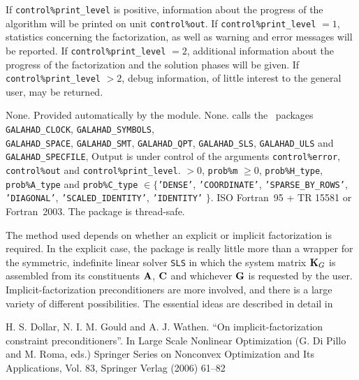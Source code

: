 \documentclass{galahad}
\newcommand{\packagename}{SBLS}
\begin{document}

\galinfo
If {\tt control\%print\_level} is positive, information about the progress
of the algorithm will be printed on unit {\tt control\-\%out}.
If {\tt control\%print\_level} $= 1$, statistics concerning the factorization,
as well as warning and error messages will be reported.
If {\tt control\%print\_level} $= 2$, additional information about the
progress of the factorization and the solution phases will be given.
If {\tt control\%print\_level} $> 2$, debug information, of little
interest to the general user, may be returned.


\galgeneral

\galcommon None.
\galworkspace Provided automatically by the module.
\galroutines None.
\galmodules {\tt \packagename\_solve} calls the \galahad\ packages
{\tt GALAHAD\_CLOCK},
{\tt GALAHAD\_SY\-M\-BOLS}, \\
{\tt GALAHAD\-\_SPACE},
{\tt GALAHAD\_SMT},
{\tt GALAHAD\_QPT},
{\tt GALAHAD\_SLS},
{\tt GALAHAD\_ULS} and
{\tt GALAHAD\_SPECFILE},
\galio Output is under control of the arguments
 {\tt control\%error}, {\tt control\%out} and {\tt control\%print\_level}.
 $> 0$, {\tt prob\%m} $\geq  0$,
{\tt prob\%H\_type}, {\tt prob\%A\_type}
and {\tt prob\%C\_type} $\in \{${\tt 'DENSE'},
 {\tt 'COORDINATE'}, {\tt 'SPARSE\_BY\_ROWS'}, {\tt 'DIAGONAL'},
 {\tt 'SCALED\_IDENTITY'}, {\tt 'IDENTITY'} $\}$.
\galportability ISO Fortran~95 + TR 15581 or Fortran~2003.
The package is thread-safe.


\galmethod
The method used depends on whether an explicit or implicit
factorization is required. In the explicit case, the
package is really little more than a wrapper for the
symmetric, indefinite linear solver {\tt SLS} in
which the system matrix ${\mathbf{K}}_G$ is assembled from its constituents
${\mathbf{A}}$, ${\mathbf{C}}$ and whichever ${\mathbf{G}}$ is requested by the user.
Implicit-factorization preconditioners are more involved,
and there is a large variety of different possibilities. The
essential ideas are described in detail in
\vspace*{1mm}

\noindent
H. S. Dollar, N. I. M. Gould and A. J. Wathen.
``On implicit-factorization constraint preconditioners''.
In  Large Scale Nonlinear Optimization (G. Di Pillo and M. Roma, eds.)
Springer Series on Nonconvex Optimization and Its Applications, Vol. 83,
Springer Verlag (2006) 61--82
\end{document}
